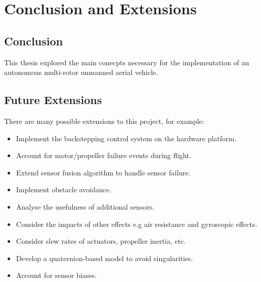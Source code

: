 
\chapter{Conclusion and Extensions}

\section{Conclusion}
This thesis explored the main conecpts necessary for the implementation of an autonomous multi-rotor unmanned aerial vehicle.

\section{Future Extensions}
There are many possible extensions to this project, for example:

\begin{itemize}
\item Implement the backstepping control system on the hardware platform.
\item Account for motor/propeller failure events during flight.
\item Extend sensor fusion algorithm to handle sensor failure.
\item Implement obstacle avoidance.
\item Analyse the usefulness of additional sensors.
\item Consider the impacts of other effects e.g air resistance and gyroscopic effects.
\item Consider slew rates of actuators, propeller inertia, etc.
\item Develop a quaternion-based model to avoid singularities.
\item Account for sensor biases.


\end{itemize}

\clearpage


